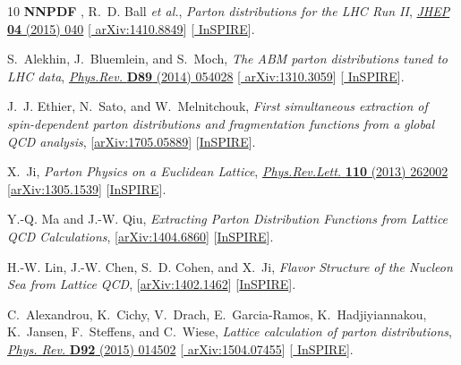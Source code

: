 \begin{thebibliography}{10}
{\bfseries NNPDF} , R.~D. Ball {\em et al.}, {\it {Parton distributions for the
  LHC Run II}},
\href{http://dx.doi.org/10.1007/JHEP04(2015)040}{{\em JHEP} {\bfseries 04}
  (2015) 040} [\href{http://arxiv.org/abs/1410.8849}{{\ttfamily
  arXiv:1410.8849}}] [\href{http://inspirehep.net/record/1325552s}{{\ttfamily
  InSPIRE}}].

S.~Alekhin, J.~Bluemlein, and S.~Moch, {\it {The ABM parton distributions tuned
  to LHC data}},
\href{http://dx.doi.org/10.1103/PhysRevD.89.054028}{{\em Phys.Rev.} {\bfseries
  D89} (2014) 054028} [\href{http://arxiv.org/abs/1310.3059}{{\ttfamily
  arXiv:1310.3059}}] [\href{http://inspirehep.net/record/1258127}{{\ttfamily
  InSPIRE}}].

J.~J. Ethier, N.~Sato, and W.~Melnitchouk,
{\it {First simultaneous extraction of spin-dependent parton distributions and
  fragmentation functions from a global QCD analysis}},
  [\href{http://arxiv.org/abs/1705.05889}{{\ttfamily arXiv:1705.05889}}]
  [\href{http://inspirehep.net/record/1599958}{{\ttfamily InSPIRE}}].

X.~Ji, {\it {Parton Physics on a Euclidean Lattice}},
\href{http://dx.doi.org/10.1103/PhysRevLett.110.262002}{{\em Phys.Rev.Lett.}
  {\bfseries 110} (2013) 262002}
  [\href{http://arxiv.org/abs/1305.1539}{{\ttfamily arXiv:1305.1539}}]
  [\href{http://inspirehep.net/record/1232221}{{\ttfamily InSPIRE}}].

Y.-Q. Ma and J.-W. Qiu,
{\it {Extracting Parton Distribution Functions from Lattice QCD Calculations}},
   [\href{http://arxiv.org/abs/1404.6860}{{\ttfamily arXiv:1404.6860}}]
  [\href{http://inspirehep.net/record/1292807}{{\ttfamily InSPIRE}}].

H.-W. Lin, J.-W. Chen, S.~D. Cohen, and X.~Ji,
{\it {Flavor Structure of the Nucleon Sea from Lattice QCD}},
  [\href{http://arxiv.org/abs/1402.1462}{{\ttfamily arXiv:1402.1462}}]
  [\href{http://inspirehep.net/record/1280317}{{\ttfamily InSPIRE}}].

C.~Alexandrou, K.~Cichy, V.~Drach, E.~Garcia-Ramos, K.~Hadjiyiannakou,
  K.~Jansen, F.~Steffens, and C.~Wiese, {\it {Lattice calculation of parton
  distributions}},
\href{http://dx.doi.org/10.1103/PhysRevD.92.014502}{{\em Phys. Rev.} {\bfseries
  D92} (2015) 014502} [\href{http://arxiv.org/abs/1504.07455}{{\ttfamily
  arXiv:1504.07455}}] [\href{http://inspirehep.net/record/1365095}{{\ttfamily
  InSPIRE}}].


\end{thebibliography}
